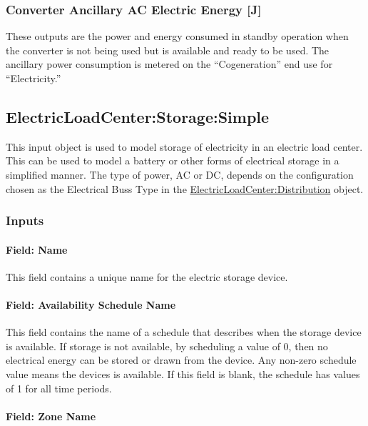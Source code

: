 \subsubsection{Converter Ancillary AC Electric Energy {[}J{]}}\label{converter-ancillary-ac-electric-energy-j}

These outputs are the power and energy consumed in standby operation when the converter is not being used but is available and ready to be used. The ancillary power consumption is metered on the ``Cogeneration'' end use for ``Electricity.''

\subsection{ElectricLoadCenter:Storage:Simple}\label{electricloadcenterstoragesimple}

This input object is used to model storage of electricity in an electric load center. This can be used to model a battery or other forms of electrical storage in a simplified manner. The type of power, AC or DC, depends on the configuration chosen as the Electrical Buss Type in the \hyperref[electricloadcenterdistribution]{ElectricLoadCenter:Distribution} object.

\subsubsection{Inputs}\label{inputs-6-007}

\paragraph{Field: Name}\label{field-name-6-005}

This field contains a unique name for the electric storage device.

\paragraph{Field: Availability Schedule Name}\label{field-availability-schedule-name-5-000}

This field contains the name of a schedule that describes when the storage device is available. If storage is not available, by scheduling a value of 0, then no electrical energy can be stored or drawn from the device. Any non-zero schedule value means the devices is available. If this field is blank, the schedule has values of 1 for all time periods.

\paragraph{Field: Zone Name}\label{field-zone-name-5-000}

